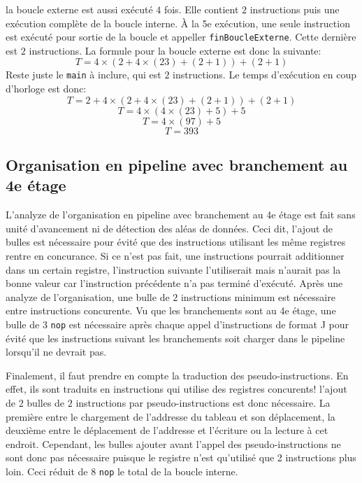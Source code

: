 \documentclass[a11paper]{article}
\newcommand{\todo}[1]{\begin{color}{Red}\textbf{TODO:} #1\end{color}}
\begin{document}
la boucle externe est aussi exécuté $4$ fois. Elle contient $2$ instructions puis une exécution complète de la boucle interne. À la 5e exécution, une seule instruction est exécuté
pour sortie de la boucle et appeller \verb|finBoucleExterne|. Cette dernière est $2$ instructions. La formule pour la boucle externe est donc la suivante:
$$
T = 4\times(2+4\times(23)+(2+1)) + (2+1)
$$
Reste juste le \verb|main| à inclure, qui est $2$ instructions. Le temps d'exécution en coup d'horloge est donc:
$$
T = 2+ 4\times(2+4\times(23)+(2+1)) + (2+1)
$$
$$
T = 4\times(4\times(23)+5) + 5
$$
$$
T = 4\times(97) + 5
$$
$$
T = 393
$$

\subsection{Organisation en pipeline avec branchement au 4e étage}
L'analyze de l'organisation en pipeline avec branchement au 4e étage est fait sans unité d'avancement ni de détection des aléas de données. Ceci dit, l'ajout de bulles est
nécessaire pour évité que des instructions utilisant les même registres rentre en concurance. Si ce n'est pas fait, une instructions pourrait additionner dans un certain registre, 
l'instruction suivante l'utiliserait mais n'aurait pas la bonne valeur car l'instruction précédente n'a pas terminé d'exécuté. Après une analyze de l'organisation, une bulle de $2$
instructions minimum est nécessaire entre instructions concurente. Vu que les branchements sont au 4e étage, une bulle de $3$ \verb|nop| est nécessaire après chaque appel
d'instructions de format J pour évité que les instructions suivant les branchements soit charger dans le pipeline lorsqu'il ne devrait pas.

Finalement, il faut prendre en compte la traduction des pseudo-instructions. En effet, ils sont traduits en instructions qui utilise des registres concurents! l'ajout de 2 bulles
de $2$ instructions par pseudo-instructions est donc nécessaire. La première entre le chargement de l'addresse du tableau et son déplacement, la deuxième entre le déplacement de
l'addresse et l'écriture ou la lecture à cet endroit. Cependant, les bulles ajouter avant l'appel des pseudo-instructions ne sont donc pas nécessaire puisque le registre n'est
qu'utilisé que 2 instructions plus loin. Ceci réduit de 8 \verb|nop| le total de la boucle interne.
\end{document}
